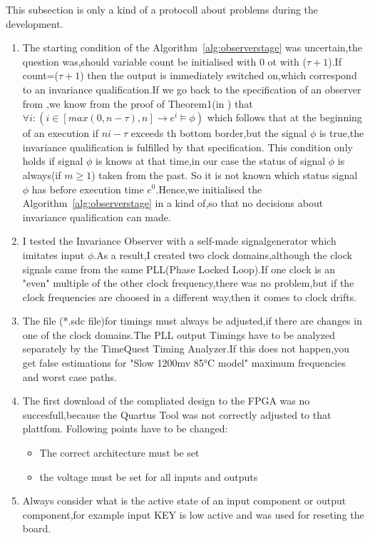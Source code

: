 This subsection is only a kind of a protocoll about problems during the development.
\begin{enumerate}
\item The starting condition of the Algorithm~\ref{alg:observerstage} was uncertain,the question was,should variable
count be initialised with 0 ot with ($\tau + 1$).If count=($\tau + 1$) then the output is immediately switched on,which
correspond to an invariance qualification.If we go back to the specification of an observer from \cite{RTFMBJ13},we know from
the proof of Theorem1(in \cite{RTFMBJ13}) that $\forall i:(i \in [max(0,n-\tau),n] \rightarrow e^i \models \phi)$ which follows 
that at the beginning of an execution if $ni-\tau$ exceeds th bottom border,but the signal $\phi$ is true,the invariance qualification
is fulfilled by that specification. 
This condition only holds if signal $\phi$ is knows at that time,in our case the status of signal $\phi$ is always(if $m \ge 1$) taken from the past.
So it is not known which status signal $\phi$ has before execution time $e^0$.Hence,we initialised the Algorithm~\ref{alg:observerstage} in a kind of,so that
no decisions about invariance qualification can made.
\item I tested the Invariance Observer with a  self-made signalgenerator which imitates input $\phi$.As a result,I created two clock domains,although the clock signals
came from the same PLL(Phase Locked Loop).If one clock is an "even" multiple of the other clock frequency,there was no problem,but if the clock frequencies are choosed in a different way,then
it comes to clock drifts.
\item The file (*.sdc file)for timings must always be adjusted,if there are changes in one of the clock domains.The PLL output Timings have to be analyzed separately by the
TimeQuest Timing Analyzer.If this does not happen,you get false estimations for "Slow 1200mv 85°C model" maximum frequencies and worst case paths.
\item The first download of the compliated design to the FPGA was no succesfull,because the Quartus Tool was not correctly adjusted to that plattfom.
Following points have to be changed:
\begin{itemize}
\item The correct architecture must be set
\item the voltage must be set for all inputs and outputs
\end{itemize}
\item Always consider what is the active state of an input component or output component,for example
input KEY is low active and was used for reseting the board. 
\end{enumerate}
